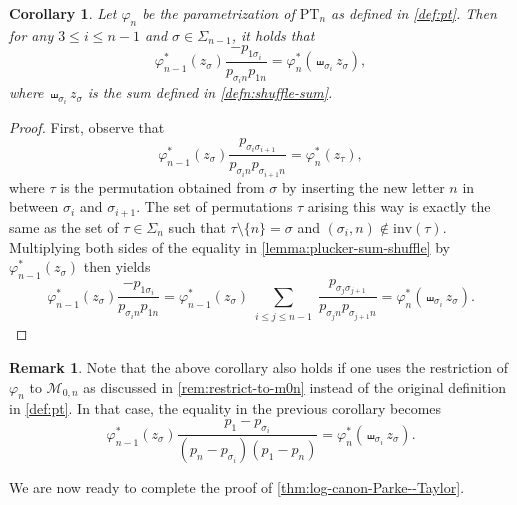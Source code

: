 \documentclass[12pt, reqno]{amsart}
\numberwithin{equation}{section}
\theoremstyle{plain}
\newtheorem{corollary}[theorem]{Corollary}
\theoremstyle{definition}
\newtheorem{remark}[theorem]{Remark}
\newcommand{\cm}{\mathcal{M}}
\newcommand{\pt}{\mathrm{PT}}
\newcommand{\inv}{\mathrm{inv}}
\begin{document}
\begin{corollary}
\label{cor:pt-recursive-shuffle}
Let $\varphi_n$ be the parametrization of $\pt_n$ as defined in \cref{def:pt}. Then for any $3 \leq i\leq n-1$ and $\sigma \in \Sigma_{n-1}$, it holds that
\[
\varphi_{n-1}^\ast(z_\sigma) \frac{-p_{1 \sigma_i }}{p_{\sigma_i n} p_{1n}} = \varphi_n^\ast(\shuffle_{\sigma_i} z_\sigma),
\]
where $\shuffle_{\sigma_i} z_\sigma$ is the sum defined in \cref{defn:shuffle-sum}. 
\end{corollary}
\begin{proof}
First, observe that
\[
\varphi_{n-1}^\ast(z_\sigma) \frac{p_{\sigma_i \sigma_{i + 1}}}{p_{\sigma_i n}p_{\sigma_{i +1} n}} = \varphi_n^\ast(z_\tau),
\]
where $\tau$ is the permutation obtained from $\sigma$ by inserting the new letter $n$ in between $\sigma_{i}$ and $\sigma_{i+1}$. The set of permutations $\tau$ arising this way is exactly the same as the set of $\tau \in \Sigma_n$ such that $\tau \setminus \{n\} = \sigma$ and $(\sigma_i, n) \notin \inv(\tau)$. Multiplying both sides of the equality in \cref{lemma:plucker-sum-shuffle} by $\varphi_{n-1}^\ast(z_\sigma)$ then yields
\[
\varphi_{n-1}^\ast(z_\sigma)\frac{-p_{1 \sigma_i}}{p_{\sigma_i n} p_{1n}} = \varphi_{n-1}^\ast(z_\sigma)
\sum_{\substack{i \leq j \leq n-1}} \frac{p_{\sigma_j \sigma_{j + 1}}}{p_{\sigma_j n}p_{\sigma_{j +1} n}} = \varphi_n^\ast(\shuffle_{\sigma_i} z_\sigma).
\]

\end{proof}


\begin{remark}
\label{rem:alternate-pt-shuffle}
Note that the above corollary also holds if one uses the restriction of $\varphi_n$ to $\cm_{0, n}$ as discussed in \cref{rem:restrict-to-m0n} instead of the original definition in \cref{def:pt}. In that case, the equality in the previous corollary becomes
\[
\varphi_{n-1}^\ast(z_\sigma) \frac{p_1 - p_{\sigma_i}}{(p_{n} - p_{\sigma_i}) (p_{1} - p_n)} = \varphi_n^\ast(\shuffle_{\sigma_i} z_\sigma).
\]
\end{remark}

We are now ready to complete the proof of \cref{thm:log-canon-Parke--Taylor}.
\end{document}
